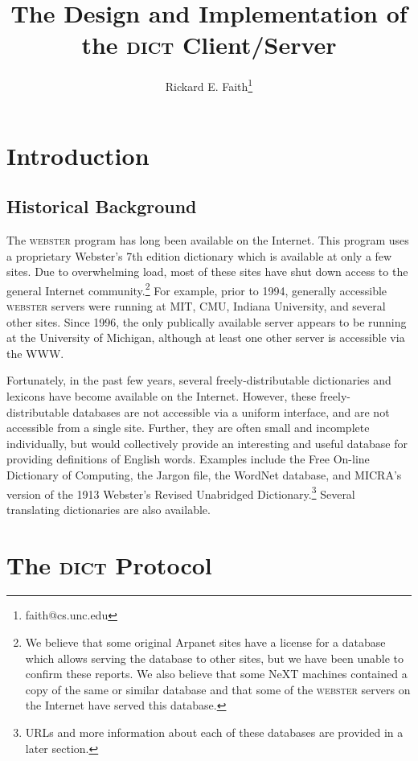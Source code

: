 \documentclass{article}
\newcommand{\dict}{\textsc{dict}\xspace}
\newcommand{\webster}{\textsc{webster}\xspace}
\begin{document}
\title{The Design and Implementation of the \dict Client/Server}
\author{Rickard E. Faith\thanks{faith@cs.unc.edu}}
\maketitle


\section{Introduction}


\subsection{Historical Background}

The \webster program has long been available on the Internet.  This program
uses a proprietary Webster's 7th edition dictionary which is available at
only a few sites.  Due to overwhelming load, most of these sites have shut
down access to the general Internet community.\footnote{We believe that
  some original Arpanet sites have a license for a database which allows
  serving the database to other sites, but we have been unable to confirm
  these reports.  We also believe that some NeXT machines contained a copy
  of the same or similar database and that some of the \webster servers on
  the Internet have served this database.} For example, prior to 1994,
generally accessible \webster servers were running at MIT, CMU, Indiana
University, and several other sites.  Since 1996, the only publically
available server appears to be running at the University of Michigan,
although at least one other server is accessible via the WWW.

Fortunately, in the past few years, several freely-distributable
dictionaries and lexicons have become available on the Internet.  However,
these freely-distributable databases are not accessible via a uniform
interface, and are not accessible from a single site.  Further, they are
often small and incomplete individually, but would collectively provide an
interesting and useful database for providing definitions of English words.
Examples include the Free On-line Dictionary of Computing, the Jargon file,
the WordNet database, and MICRA's version of the 1913 Webster's Revised
Unabridged Dictionary.\footnote{URLs and more information about each of
  these databases are provided in a later section.} Several translating
dictionaries are also available.

\section{The \dict Protocol}
\end{document}
